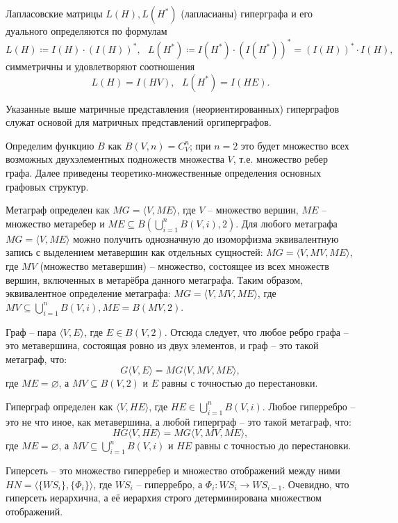 Лапласовские матрицы $L(H), L(H^*)$ (лапласианы) гиперграфа и его дуального определяются по формулам
$$L(H) \coloneqq I(H) \cdot (I(H))^*, \text{ } L(H^*) \coloneqq I(H^*)\cdot (I(H^*))^*=(I(H))^* \cdot I(H),$$
симметричны и удовлетворяют соотношения
$$L(H)=I(HV), \text{ }L(H^*)=I(HE).$$

Указанные выше матричные представления (неориентированных) гиперграфов служат основой для матричных представлений оргиперграфов.


Определим функцию $B$ как $B(V,n) = C_V^n $; при $n=2$ это будет множество всех возможных двухэлементных подножеств множества $V$, т.е. множество ребер графа. Далее приведены теоретико-множественные определения основных графовых структур.

Метаграф определен как $MG=\langle V, ME \rangle$, где $V$ -- множество вершин, $ME$ -- множество метаребер и $ME\subseteq B( \bigcup \limits_{i=1}^{n}B(V, i),2)$.
Для любого метаграфа $MG=\langle V, ME \rangle$ можно получить однозначную до изоморфизма эквивалентную запись с выделением метавершин как отдельных сущностей: $MG=\langle V, MV, ME \rangle$, где $MV$ (множество метавершин) -- множество, состоящее из всех множеств вершин, включенных в метарёбра данного метаграфа. Таким образом, эквивалентное определение метаграфа:
$MG = \langle V,MV,ME \rangle$, где $MV \subseteq \bigcup \limits_{i=1}^{n}B(V, i), ME=B(MV,2).$

Граф -- пара $\langle V, E \rangle$, где $E \in B(V,2)$. Отсюда следует, что любое ребро графа -- это метавершина, состоящая ровно из двух элементов, и граф -- это такой метаграф, что:
$$G\langle V, E \rangle = MG\langle V, MV, ME \rangle,$$ где $ME =\varnothing$, а $MV \subseteq B(V, 2)$ и $E$ равны с точностью до перестановки.

Гиперграф определен как $\langle V, HE\rangle$, где $HE \in \bigcup \limits_{i=1}^{n}B(V,i)$. Любое гиперребро -- это не что иное, как метавершина, а любой гиперграф -- это такой метаграф, что:
$$HG\langle V, HE \rangle = MG\langle V, MV, ME \rangle,$$ где $ME =\varnothing$, а $MV \subseteq \bigcup \limits_{i=1}^{n}B(V, i)$ и $HE$ равны с точностью до перестановки. 

Гиперсеть -- это множество гиперребер и множество отображений между ними $HN = \langle \{WS_i\}, \{\Phi_i\}\rangle$, где $WS_i$ -- гиперребро, а $\Phi_i: WS_i \to WS_{i-1}$. Очевидно, что гиперсеть иерархична, а её иерархия строго детерминирована множеством отображений.

